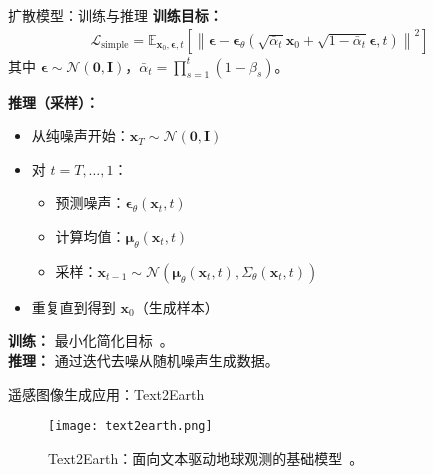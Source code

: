 \begin{refsection}
\begin{frame}{扩散模型：训练与推理}
  \footnotesize
  \textbf{训练目标：}
  \begin{align*}
    \mathcal{L}_{\mathrm{simple}} = \mathbb{E}_{\mathbf{x}_0, \boldsymbol{\epsilon}, t} \left[ \left\| \boldsymbol{\epsilon} - \boldsymbol{\epsilon}_\theta(\sqrt{\bar{\alpha}_t}\mathbf{x}_0 + \sqrt{1-\bar{\alpha}_t}\boldsymbol{\epsilon}, t) \right\|^2 \right]
  \end{align*}
  其中 $\boldsymbol{\epsilon} \sim \mathcal{N}(\mathbf{0}, \mathbf{I})$，$\bar{\alpha}_t = \prod_{s=1}^t (1-\beta_s)$。

  \vspace{0.5em}
  \textbf{推理（采样）：}
  \begin{itemize}
    \item 从纯噪声开始：$\mathbf{x}_T \sim \mathcal{N}(\mathbf{0}, \mathbf{I})$
    \item 对 $t = T, \ldots, 1$：
      \begin{itemize}
        \item 预测噪声：$\boldsymbol{\epsilon}_\theta(\mathbf{x}_t, t)$
        \item 计算均值：$\boldsymbol{\mu}_\theta(\mathbf{x}_t, t)$
        \item 采样：$\mathbf{x}_{t-1} \sim \mathcal{N}(\boldsymbol{\mu}_\theta(\mathbf{x}_t, t), \Sigma_\theta(\mathbf{x}_t, t))$
      \end{itemize}
    \item 重复直到得到 $\mathbf{x}_0$（生成样本）
  \end{itemize}

  \vspace{0.5em}
  \scriptsize
  \textbf{训练：} 最小化简化目标~\parencite{ho2020denoising}。\\
  \textbf{推理：} 通过迭代去噪从随机噪声生成数据。
  \bottomleftrefs
\end{frame}
\end{refsection}


\begin{refsection}
  \begin{frame}{遥感图像生成应用：Text2Earth}
    \begin{figure}
      \centering
      \texttt{[image: text2earth.png]}
      \caption[]{\scriptsize Text2Earth：面向文本驱动地球观测的基础模型~\parencite{text2earth2025}。}
    \end{figure}
    \bottomleftrefs
  \end{frame}
\end{refsection}

